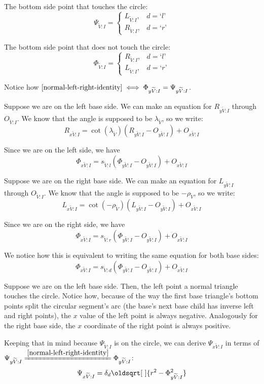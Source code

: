 \documentclass[a4paper,12pt]{article}
\newcommand{\HSindexpart}[1]{\text{`}#1\text{'}}
\newcommand{\HSview}[1][V]{\widetilde{#1}}
\newcommand{\HSL}[1][I]{L_{\HSview:#1}}
\newcommand{\HSR}[1][I]{R_{\HSview:#1}}
\newcommand{\HSLx}[1][I]{L_{x\HSview:#1}}
\newcommand{\HSRx}[1][I]{R_{x\HSview:#1}}
\newcommand{\HSLy}[1][I]{L_{y\HSview:#1}}
\newcommand{\HSRy}[1][I]{R_{y\HSview:#1}}
\newcommand{\HSPSI}[1][I]{\Psi_{\HSview:#1}}
\newcommand{\HSPSIx}[1][I]{\Psi_{x\HSview:#1}}
\newcommand{\HSPSIy}[1][I]{\Psi_{y\HSview:#1}}
\newcommand{\HSPHI}[1][I]{\Phi_{\HSview:#1}}
\newcommand{\HSPHIx}[1][I]{\Phi_{x\HSview:#1}}
\newcommand{\HSPHIy}[1][I]{\Phi_{y\HSview:#1}}
\newcommand{\HSO}[1][I]{O_{\HSview:#1}}
\newcommand{\HSOx}[1][I]{O_{x\HSview:#1}}
\newcommand{\HSOy}[1][I]{O_{y\HSview:#1}}
\newcommand{\HSlambda}{\lambda_{\HSview}}
\newcommand{\HSrho}{\rho_{\HSview}}
\newcommand{\HSdelta}[1][d]{\delta_{#1}}
\newcommand{\HSs}[1][d]{s_{\HSview:#1}}
\renewcommand*{\sqrt}[2][\ ]{\oldsqrt[#1]{#2} }
\theoremstyle{definition}
\theoremstyle{plain}
\begin{document}
	The bottom side point that touches the circle:
	$$\HSPSI = \begin{cases}
		\HSL, & d = \HSindexpart{l}\\
		\HSR, & d = \HSindexpart{r}
	\end{cases}$$

	The bottom side point that does not touch the circle:
	$$\HSPHI = \begin{cases}
		\HSR, & d = \HSindexpart{l}\\
		\HSL, & d = \HSindexpart{r}
	\end{cases}$$

	Notice how $\eqref{normal-left-right-identity} \iff \HSPHIy = \HSPSIy$.

	Suppose we are on the left base side.
	We can make an equation for $\HSRy$ through $\HSO$. We know that the angle is supposed to be $\HSlambda$, so we write:
	$$\HSRx = \cot\left(\HSlambda\right)\left(\HSRy - \HSOy\right) + \HSOx$$

	Since we are on the left side, we have
	$$\HSPHIx = \HSs[l]\left(\HSPHIy - \HSOy\right) + \HSOx$$
	
	Suppose we are on the right base side.
	We can make an equation for $\HSLy$ through $\HSO$. We know that the angle is supposed to be $-\HSrho$, so we write:
	$$\HSLx = \cot\left(-\HSrho\right)\left(\HSLy - \HSOy\right) + \HSOx$$

	Since we are on the right side, we have
	$$\HSPHIx = \HSs[r]\left(\HSPHIy - \HSOy\right) + \HSOx$$

	We notice how this is equivalent to writing the same equation for both base sides:
	\begin{equation}
		\HSPHIx = \HSs\left(\HSPHIy - \HSOy\right) + \HSOx \label{normal-phi-x-identity}
	\end{equation}
	
	Suppose we are on the left base side. Then, the left point a normal triangle touches the circle.
	Notice how, because of the way the first base triangle's bottom points split the circular segment's arc
	(the base's next base child has inverse left and right points), the $x$ value of the left point is always negative.
	Analogously for the right base side, the $x$ coordinate of the right point is always positive.

	Keeping that in mind because $\HSPSI$ is on the circle, we can derive $\HSPSIx$ in terms of $\HSPSIy \xlongequal{\eqref{normal-left-right-identity}} \HSPHIy$:
	\begin{equation}
		\HSPSIx = \HSdelta \sqrt{r^2 - \HSPHIy^2} \label{normal-psi-x-identity}
	\end{equation}
	
\end{document}
